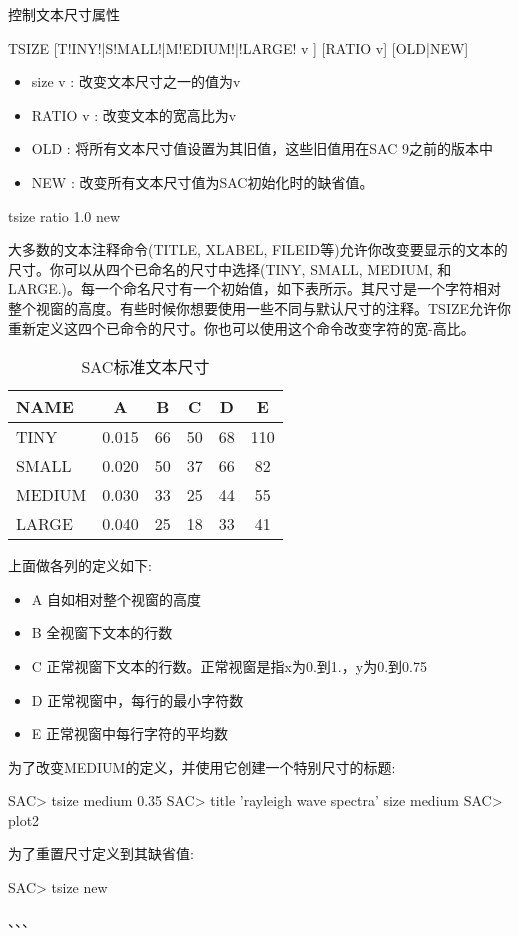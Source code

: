 \label{cmd:tsize}

控制文本尺寸属性

\begin{SACSTX}
TSIZE [T!INY!|S!MALL!|M!EDIUM!|!LARGE! v ] [RATIO v] [OLD|NEW]
\end{SACSTX}

\begin{itemize}
\item size v : 改变文本尺寸之一的值为v 
\item RATIO v : 改变文本的宽高比为v 
\item OLD : 将所有文本尺寸值设置为其旧值，这些旧值用在SAC 9之前的版本中 
\item NEW : 改变所有文本尺寸值为SAC初始化时的缺省值。
\end{itemize}

\begin{SACDFT}
tsize ratio 1.0 new
\end{SACDFT}

大多数的文本注释命令(TITLE, XLABEL, FILEID等)允许你改变要显示的文本的尺寸。你可以从四个已命名的尺寸中选择(TINY, SMALL, MEDIUM, 和LARGE.)。每一个命名尺寸有一个初始值，如下表所示。其尺寸是一个字符相对整个视窗的高度。有些时候你想要使用一些不同与默认尺寸的注释。TSIZE允许你重新定义这四个已命令的尺寸。你也可以使用这个命令改变字符的宽-高比。
\begin{table}[!ht]
\centering
\caption{SAC标准文本尺寸}
\begin{tabular}{lccccc}
\toprule
NAME	&	A	&	B	&	C	&	D	&	E	\\
\midrule
TINY 	& 0.015 &   66 	&  50  	&	68  &	110	\\
SMALL	& 0.020 &	50  &  37  	&	66  &	82	\\
MEDIUM  & 0.030 &	33  &  25  	&	44  &	55	\\
LARGE	& 0.040 &	25  &  18  	&	33  &	41	\\
\bottomrule
\end{tabular}
\end{table}

上面做各列的定义如下:
\begin{itemize}
\item A 自如相对整个视窗的高度
\item B 全视窗下文本的行数
\item C 正常视窗下文本的行数。正常视窗是指x为0.到1.，y为0.到0.75
\item D 正常视窗中，每行的最小字符数
\item E 正常视窗中每行字符的平均数
\end{itemize}

为了改变MEDIUM的定义，并使用它创建一个特别尺寸的标题:
\begin{SACCode}
SAC> tsize medium 0.35
SAC> title 'rayleigh wave spectra' size medium
SAC> plot2
\end{SACCode}

为了重置尺寸定义到其缺省值:
\begin{SACCode}
SAC> tsize new
\end{SACCode}

、、、
